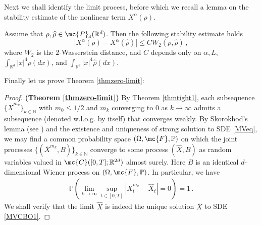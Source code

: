 \documentclass{ims9x6}
\renewcommand{\hat}{\widehat}
\newcommand{\RR}{\mathbb{R}}
\newcommand{\PP}{\mathbb{P}}
\newcommand{\OX}{\overline{X}}
\begin{document}
Next we shall identify the limit process, before which we recall a lemma on the stability estimate of the nonlinear term $X^\alpha(\rho)$.
\begin{lemma}{\cite[Lemma 3.2]{carrillo2018analytical}}\label{lemsta} 
	Assume that $\rho,\hat \rho\in\mc{P}_4(\RR^{d})$. Then the following stability estimate holds
	\begin{equation}\label{lemstaeq}
	|X^\alpha(\rho)-X^\alpha(\widehat \rho)|\leq CW_2(\rho,\widehat \rho)\,,
	\end{equation}
	where $W_2$ is the $2$-Wasserstein distance, and $C$ depends only on $\alpha,L$,  $\int_{\RR^d}|x|^4\rho(dx)$, and $\int_{\RR^d}|x|^4\hat\rho(dx)$.
\end{lemma}
Finally let us prove Theorem \ref{thmzero-limit}:
\begin{proof}{\textbf{(Theorem \ref{thmzero-limit})}}
	By Theorem \ref{thmtight1},  each subsequence $\{\OX^{m_k}\}_{k\in\mathbb N}$ with $m_0\leq 1/2$ and $m_k$ converging to $0$ as $k\rightarrow \infty$  admits a subsequence (denoted w.l.o.g. by itself) that converges weakly.
	By Skorokhod's lemma (see \cite[Theorem 6.7 on page
	70]{billingsley2013convergence}) and the existence and uniqueness of strong solution to SDE \eqref{MVeq},   we may find a common probability space $(\Omega,\mc{F},\PP)$ on which the joint processes $\{(\OX^{m_k},B)\}_{k\in\mathbb N}$ converge to some process $(\widehat X,B)$ as random variables valued in $\mc{C}([0,T];\RR^{2d})$ almost surely. Here $B$ is an identical $d$-dimensional Wiener process on $(\Omega,\mc{F},\PP)$. In particular, we have 
	\begin{align}
	\mathbb P\left( \lim_{k\rightarrow \infty} \sup\limits_{t\in[0,T]}|\OX^{m_k}_t-\widehat X_t| =0 \right)=1\,. \label{converge-as}
	\end{align}
	We shall verify that the limit $\widehat X$ is indeed the unique solution $\OX$ to SDE \eqref{MVCBO1}.
		

\end{proof}
\end{document}
